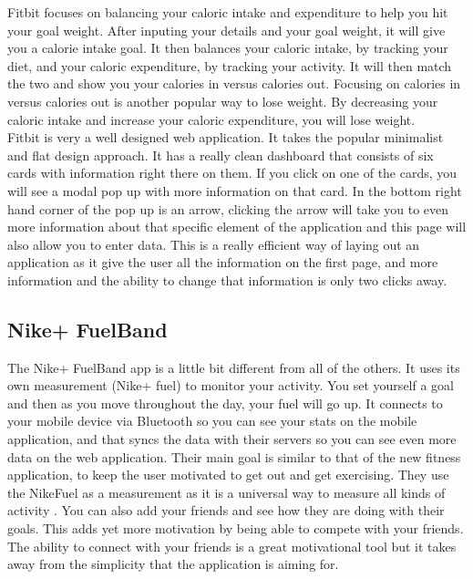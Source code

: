 Fitbit focuses on balancing your caloric intake and expenditure to help you hit your goal weight. After inputing your details and your goal weight, it will give you a calorie intake goal. It then balances your caloric intake, by tracking your diet, and your caloric expenditure, by tracking your activity. It will then match the two and show you your calories in versus calories out. Focusing on calories in versus calories out is another popular way to lose weight. By decreasing your caloric intake and increase your caloric expenditure, you will lose weight.\\

Fitbit is very a well designed web application. It takes the popular minimalist and flat design approach. It has a really clean dashboard that consists of six cards with information right there on them. If you click on one of the cards, you will see a modal pop up with more information on that card. In the bottom right hand corner of the pop up is an arrow, clicking the arrow will take you to even more information about that specific element of the application and this page will also allow you to enter data. This is a really efficient way of laying out an application as it give the user all the information on the first page, and more information and the ability to change that information is only two clicks away.

\subsection{Nike+ FuelBand}
The Nike+ FuelBand app is a little bit different from all of the others. It uses its own measurement (Nike+ fuel) to monitor your activity. You set yourself a goal and then as you move throughout the day, your fuel will go up. It connects to your mobile device via Bluetooth so you can see your stats on the mobile application, and that syncs the data with their servers so you can see even more data on the web application. Their main goal is similar to that of the new fitness application, to keep the user motivated to get out and get exercising. They use the NikeFuel as a measurement as it is a universal way to measure all kinds of activity \citep{fuelbandpress:2013}. You can also add your friends and see how they are doing with their goals. This adds yet more motivation by being able to compete with your friends. The ability to connect with your friends is a great motivational tool but it takes away from the simplicity that the application is aiming for.

